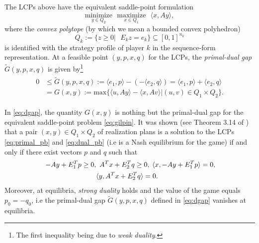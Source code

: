 \documentclass[a4paper,9pt]{extarticle}
\begin{document}
The LCPs above have the equivalent saddle-point formulation
\begin{equation}
  \underset{y \in Q_2}{\text{minimize}}\text{ }\underset{x \in
    Q_1}{\text{maximize}}\text{ }\langle x, Ay\rangle,
  \label{eq:gilpin}
\end{equation}
where the \textit{convex polytope} (by which we mean a bounded convex
polyhedron)
\begin{equation}
  Q_k := \{z \ge 0 |\text{ }E_kz = e_k\} \subseteq
  [0, 1]^{n_k}
\label{eq:polytope}
\end{equation}
is identified with the strategy profile of player $k$ in the
sequence-form representation. At a feasible point $(y, p, x, q)$ for
the LCPs, the \textit{primal-dual gap} $\tilde{G}(y, p, x, q)$ is
given by\footnote{The first inequality being due to \textit{weak
    duality}.}
\begin{eqnarray}
  \begin{split}
  0 &\le \tilde{G}(y, p, x, q) := \langle e_1, p\rangle - (-\langle
  e_2, q\rangle) = \langle e_1, p\rangle + \langle
  e_2, q\rangle\\
  &= G(x, y) := \mathrm{max}\{\langle u, Ay\rangle - \langle x, Av\rangle |
(u,v) \in Q_1 \times Q_2\}.
\end{split}
  \label{eq:dgap}
\end{eqnarray}

In \eqref{eq:dgap}, the quantity $G(x, y)$ is nothing but the primal-dual
gap for the equivalent saddle-point problem \eqref{eq:gilpin}.
It was shown (see Theorem 3.14 of \cite{vonequilibrium}) that a pair
$(x, y) \in Q_1 \times Q_2$ of realization plans is a solution to the
LCPs \eqref{eq:primal_pb} and \eqref{eq:dual_pb} (i.e is a Nash
equilibrium for the game)  if and only if there exist vectors $p$ and
$q$ such that
\begin{equation}
\begin{split}
\hspace{.25em} -Ay + E_1^Tp \ge 0, &\hspace{.5em}A^Tx + E_2^Tq \ge
0, \hspace{.25em} \langle x, -Ay + E_1^Tp\rangle = 0,\\
&\langle y, A^Tx  + E_2^Tq\rangle = 0.
\end{split}
\label{eq:feasibility}
\end{equation}
Moreover, at equilibria, \textit{strong duality} holds and the value
of the game equals $p_0 = -q_0$, i.e the primal-dual gap
$\tilde{G}(y, p, x, q)$ defined in \eqref{eq:dgap} vanishes at
equilibria.%
\end{document}
